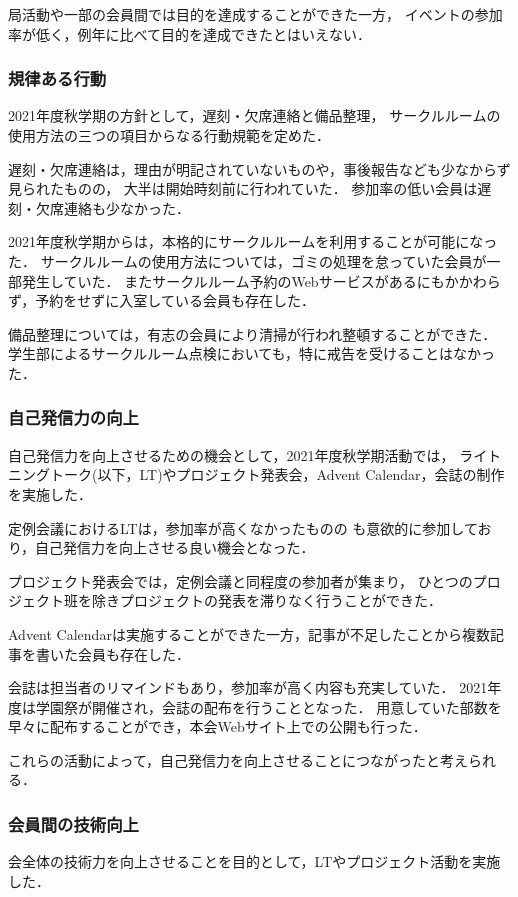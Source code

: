     局活動や一部の会員間では目的を達成することができた一方，
    イベントの参加率が低く，例年に比べて目的を達成できたとはいえない．

\subsubsection*{規律ある行動}
    2021年度秋学期の方針として，遅刻・欠席連絡と備品整理，
    サークルルームの使用方法の三つの項目からなる行動規範を定めた．
    
    遅刻・欠席連絡は，理由が明記されていないものや，事後報告なども少なからず見られたものの，
    大半は開始時刻前に行われていた．
    参加率の低い会員は遅刻・欠席連絡も少なかった．
    
    2021年度秋学期からは，本格的にサークルルームを利用することが可能になった．
    サークルルームの使用方法については，ゴミの処理を怠っていた会員が一部発生していた．
    またサークルルーム予約のWebサービスがあるにもかかわらず，予約をせずに入室している会員も存在した．
    
    備品整理については，有志の会員により清掃が行われ整頓することができた．
    学生部によるサークルルーム点検においても，特に戒告を受けることはなかった．

\subsubsection*{自己発信力の向上}
    自己発信力を向上させるための機会として，2021年度秋学期活動では，
    ライトニングトーク(以下，LT)やプロジェクト発表会，Advent Calendar，会誌の制作を実施した．

    定例会議におけるLTは，参加率が高くなかったものの
    \firstGrade{}も意欲的に参加しており，自己発信力を向上させる良い機会となった．

    プロジェクト発表会では，定例会議と同程度の参加者が集まり，
    ひとつのプロジェクト班を除きプロジェクトの発表を滞りなく行うことができた．
    
    Advent Calendarは実施することができた一方，記事が不足したことから複数記事を書いた会員も存在した．

    会誌は担当者のリマインドもあり，参加率が高く内容も充実していた．
    2021年度は学園祭が開催され，会誌の配布を行うこととなった．
    用意していた部数を早々に配布することができ，本会Webサイト上での公開も行った．
    
    これらの活動によって，自己発信力を向上させることにつながったと考えられる．
    
\subsubsection*{会員間の技術向上}
    会全体の技術力を向上させることを目的として，LTやプロジェクト活動を実施した．

